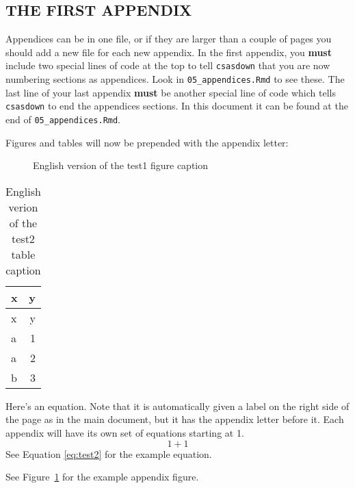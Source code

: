 \documentclass[12pt]{article}\usepackage[]{graphicx}\usepackage[]{color}
\begin{document}
\begin{appendices}

\clearpage

\section{THE FIRST APPENDIX}\label{app:first-appendix}

Appendices can be in one file, or if they are larger than a couple of pages you should add a new file for each new appendix. In the first appendix, you \textbf{must} include two special lines of code at the top to tell \texttt{csasdown} that you are now numbering sections as appendices. Look in \texttt{05\_appendices.Rmd} to see these. The last line of your last appendix \textbf{must} be another special line of code which tells \texttt{csasdown} to end the appendices sections. In this document it can be found at the end of \texttt{05\_appendices.Rmd}.

Figures and tables will now be prepended with the appendix letter:




\begin{figure}[htb]

{\centering {} 

}

\caption{English version of the test1 figure caption}\label{fig:test1}
\end{figure}
\begin{longtable}[]{@{}lr@{}}
\caption{\label{tab:test2}English verion of the test2 table caption}\tabularnewline
\toprule
x & y\tabularnewline
\midrule
\endfirsthead
\toprule
x & y\tabularnewline
\midrule
\endhead
a & 1\tabularnewline
a & 2\tabularnewline
b & 3\tabularnewline
\bottomrule
\end{longtable}
Here's an equation. Note that it is automatically given a label on the right side of the page as in the main document, but it has the appendix letter before it. Each appendix will have its own set of equations starting at 1.
\begin{equation}
  1 + 1
  \label{eq:test2}
\end{equation}
See Equation \eqref{eq:test2} for the example equation.

See Figure~\ref{fig:test1} for the example appendix figure.


\end{appendices}
\end{document}

